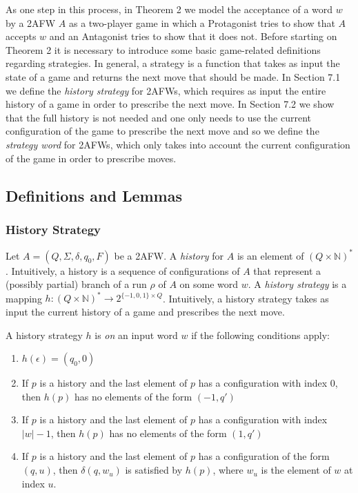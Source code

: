 \documentclass{lmcs}
\theoremstyle{definition}
\DeclareMathOperator{\?}{?}
\begin{document}
As one step in this process, in Theorem 2 we model the acceptance of a word $w$ by a 2AFW $A$ as a two-player game in which a Protagonist tries to show that $A$ accepts $w$ and an Antagonist tries to show that it does not. Before starting on Theorem 2 it is necessary to introduce some basic game-related definitions regarding strategies. In general, a strategy is a function that takes as input the state of a game and returns the next move that should be made. In Section 7.1 we define the \textit{history strategy} for 2AFWs, which requires as input the entire history of a game in order to prescribe the next move. In Section 7.2 we show that the full history is not needed and one only needs to use the current configuration of the game to prescribe the next move and so we define the \textit{strategy word} for 2AFWs, which only takes into account the current configuration of the game in order to prescribe moves.


\subsection{Definitions and Lemmas}

\subsubsection{History Strategy}
Let $A = (Q,\Sigma,\delta,q_0,F)$ be a 2AFW. A \textit{history} for $A$ is an element of
$(Q \times \mathbb{N})^*$. Intuitively, a history is a sequence of configurations of $A$ that
represent a (possibly partial) branch of a run $\rho$ of $A$ on some word $w$.
A \textit{history strategy} is a mapping
$h : (Q \times \mathbb{N})^* \rightarrow 2^{\{-1,0,1 \} \times Q  }$.
Intuitively, a history strategy takes as input the current history of a game and prescribes the next move.

A history strategy $h$ is \textit{on} an input word $w$ if the following conditions apply:

\begin{enumerate}
    \item $h(\epsilon) = (q_0,0)$
    \item If $p$ is a history and the last element of $p$ has a configuration with index 0, then $h(p)$ has no elements of the form $(-1,q')$
    \item If $p$ is a history and the last element of $p$ has a configuration with index $|w| - 1$, then $h(p)$ has no elements of the form $(1,q')$
    \item If $p$ is a history and the last element of $p$ has a configuration of the form $(q,u)$, then $\delta(q,w_u)$ is satisfied by $h(p)$, where $w_u$ is the element of $w$ at index $u$.
\end{enumerate}
\end{document}

